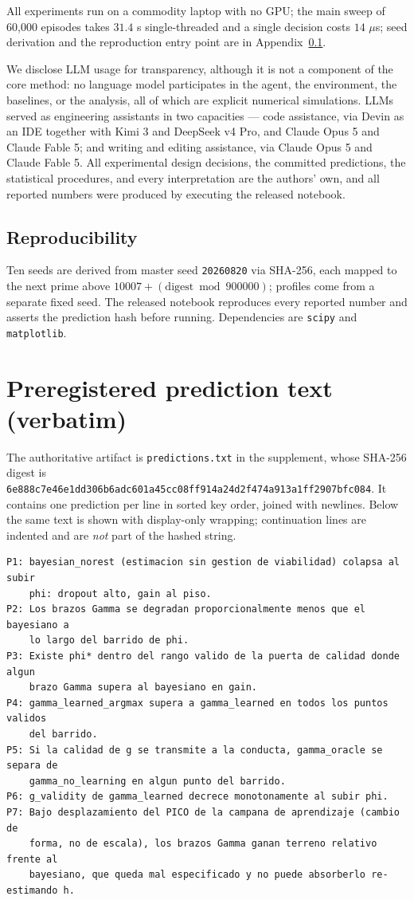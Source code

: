 \documentclass{article}
\begin{document}
All experiments run on a commodity laptop with no GPU; the main sweep of 60{,}000 episodes takes $31.4$ s single-threaded and a single decision costs $14$ $\mu$s; seed derivation and the reproduction entry point are in Appendix~\ref{app:repro}.

We disclose LLM usage for transparency, although it is not a component of the core method: no language model participates in the agent, the environment, the baselines, or the analysis, all of which are explicit numerical simulations. LLMs served as engineering assistants in two capacities --- code assistance, via Devin as an IDE together with Kimi 3 and DeepSeek v4 Pro, and Claude Opus 5 and Claude Fable 5; and writing and editing assistance, via Claude Opus 5 and Claude Fable 5. All experimental design decisions, the committed predictions, the statistical procedures, and every interpretation are the authors' own, and all reported numbers were produced by executing the released notebook.


\subsection{Reproducibility}
\label{app:repro}
Ten seeds are derived from master seed \texttt{20260820} via SHA-256, each mapped to the next prime above $10007+(\text{digest}\bmod 900000)$; profiles come from a separate fixed seed. The released notebook reproduces every reported number and asserts the prediction hash before running. Dependencies are \texttt{scipy} and \texttt{matplotlib}.

\section{Preregistered prediction text (verbatim)}
\label{app:prereg}
The authoritative artifact is \texttt{predictions.txt} in the supplement, whose SHA-256 digest is \texttt{6e888c7e46e1dd306b6adc601a45cc08ff914a24d2f474a913a1ff2907bfc084}. It contains one prediction per line in sorted key order, joined with newlines. Below the same text is shown with display-only wrapping; continuation lines are indented and are \emph{not} part of the hashed string.
{\footnotesize
\begin{verbatim}
P1: bayesian_norest (estimacion sin gestion de viabilidad) colapsa al subir
    phi: dropout alto, gain al piso.
P2: Los brazos Gamma se degradan proporcionalmente menos que el bayesiano a
    lo largo del barrido de phi.
P3: Existe phi* dentro del rango valido de la puerta de calidad donde algun
    brazo Gamma supera al bayesiano en gain.
P4: gamma_learned_argmax supera a gamma_learned en todos los puntos validos
    del barrido.
P5: Si la calidad de g se transmite a la conducta, gamma_oracle se separa de
    gamma_no_learning en algun punto del barrido.
P6: g_validity de gamma_learned decrece monotonamente al subir phi.
P7: Bajo desplazamiento del PICO de la campana de aprendizaje (cambio de
    forma, no de escala), los brazos Gamma ganan terreno relativo frente al
    bayesiano, que queda mal especificado y no puede absorberlo re-estimando h.
\end{verbatim}
}
\end{document}
